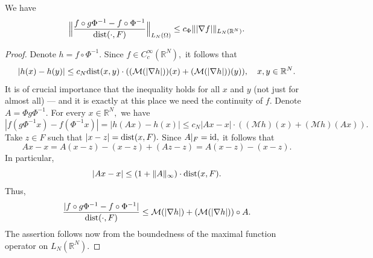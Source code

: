 \documentclass{amsart}
\begin{document}
\begin{lemma}\label{maximal function lemma} We have
$$\Big\|\frac{f\circ g\Phi^{-1}-f\circ\Phi^{-1}}{{\rm dist}(\cdot,F)}\Big\|_{L_N(\Omega)}\leq c_{\Phi}\||\nabla f|\|_{L_N(\mathbb{R}^N)}.$$
\end{lemma}
\begin{proof} Denote $h=f\circ\Phi^{-1}.$ Since $f\in C^{\infty}_c(\mathbb{R}^N),$ it follows that
$$|h(x)-h(y)|\leq c_N{\rm dist}(x,y)\cdot ((\mathcal{M}(|\nabla h|))(x)+(\mathcal{M}(|\nabla h|))(y)),\quad x,y\in\mathbb{R}^N.$$
It is of crucial importance that the inequality holds for all $x$ and $y$ (not just for almost all) --- and it is exactly at this place we need the continuity of $f.$ Denote $A=\Phi g\Phi^{-1}.$ For every $x\in\mathbb{R}^N,$ we have
$$|f(g\Phi^{-1}x)-f(\Phi^{-1}x)|=|h(Ax)-h(x)|\leq c_N|Ax-x|\cdot ((\mathcal{M}h)(x)+(\mathcal{M}h)(Ax)).$$
Take $z\in F$ such that $|x-z|={\rm dist}(x,F).$ Since $A|_F={\rm id},$ it follows that
$$Ax-x=A(x-z)-(x-z)+(Az-z)=A(x-z)-(x-z).$$
In particular,
$$|Ax-x|\leq (1+\|A\|_{\infty})\cdot{\rm dist}(x,F).$$
Thus,
$$\frac{|f\circ g\Phi^{-1}-f\circ\Phi^{-1}|}{{\rm dist}(\cdot,F)}\leq \mathcal{M}(|\nabla h|)+(\mathcal{M}(|\nabla h|))\circ A.$$
The assertion follows now from the boundedness of the maximal function operator on $L_N(\mathbb{R}^N).$
\end{proof}
\end{document}
